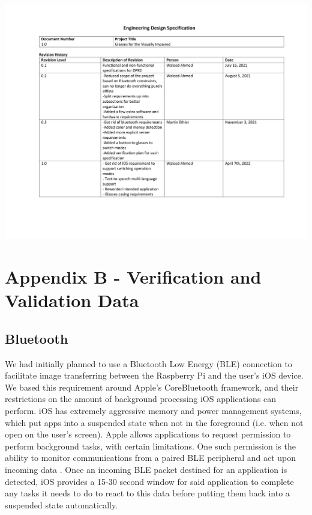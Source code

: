 \documentclass[a4paper,11pt]{article}
\begin{document}
\begin{landscape}
\begin{center}
        \newpage
        \includegraphics[page=6,width={0.86\linewidth}]{pdf/eds_1.0.pdf}
    \end{center}
\end{landscape}


\newpage
\section{Appendix B - Verification and Validation Data}
\subsection{Bluetooth}
\label{bluetooth}
We had initially planned to use a Bluetooth Low Energy (BLE) connection to facilitate image transferring between the Raspberry Pi and the user's iOS device. We based this requirement around Apple's CoreBluetooth framework, and their restrictions on the amount of background processing iOS applications can perform. iOS has extremely aggressive memory and power management systems, which put apps into a suspended state when not in the foreground (i.e. when not open on the user's screen). Apple allows applications to request permission to perform background tasks, with certain limitations. One such permission is the ability to monitor communications from a paired BLE peripheral and act upon incoming data \cite{apple-bluetooth}. Once an incoming BLE packet destined for an application is detected, iOS provides a 15-30 second window for said application to complete any tasks it needs to do to react to this data before putting them back into a suspended state automatically.
\end{document}
